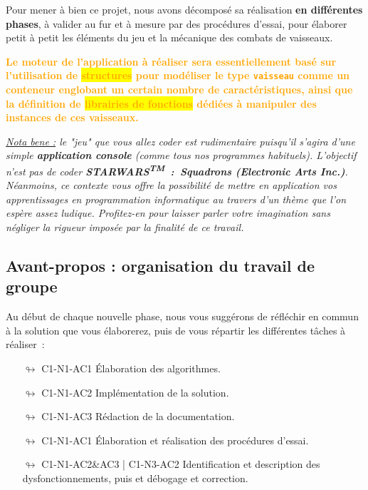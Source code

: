 \documentclass[10pt, fleqn, a4paper]{article}
\newcommand{\bfcolor}[2]{\textcolor{#1}{\textbf{#2}}}
\newcommand{\itcolor}[2]{\textcolor{#1}{\textit{#2}}}
\begin{document}
Pour mener à bien ce projet, nous avons décomposé sa réalisation \bfcolor{greenTP}{en différentes phases}, à valider au fur et à mesure par des procédures d'essai, pour élaborer petit à petit les éléments du jeu et la mécanique des combats de vaisseaux.

\bfcolor{orange}{Le moteur de l'application à réaliser sera essentiellement basé sur l'utilisation de \colorbox{yellow}{structures} pour \og{}modéliser\fg{} le type \texttt{vaisseau} comme un conteneur englobant un certain nombre de caractéristiques, ainsi que la définition de \colorbox{yellow}{librairies de fonctions} dédiées à manipuler des instances de ces vaisseaux.}

\itcolor{greenTP}{\underline{Nota bene :} le "jeu" que vous allez coder est rudimentaire puisqu'il s'agira d'une simple \textbf{application console} (comme tous nos programmes habituels). L'objectif n'est pas de coder \bfcolor{greenTP}{STARWARS\textsuperscript{TM}~:~Squadrons (Electronic Arts Inc.)}. Néanmoins, ce contexte vous offre la possibilité de mettre en application vos apprentissages en programmation informatique au travers d'un thème que l'on espère assez ludique. Profitez-en pour laisser parler votre imagination sans négliger la rigueur imposée par la finalité de ce travail.}

\subsection*{Avant-propos : organisation du travail de groupe}

Au début de chaque nouvelle phase, nous vous suggérons de réfléchir en commun à la solution que vous élaborerez, puis de vous répartir les différentes tâches à réaliser~:
\begin{itemize}
\item[$\looparrowright$] \colorbox{redC1}{C1-N1-AC1} Élaboration des algorithmes.
\item[$\looparrowright$] \colorbox{redC1}{C1-N1-AC2} Implémentation de la solution.
\item[$\looparrowright$] \colorbox{redC1}{C1-N1-AC3} Rédaction de la documentation.
\item[$\looparrowright$] \colorbox{greenC2}{C1-N1-AC1} Élaboration et réalisation des procédures d'essai.
\item[$\looparrowright$] \colorbox{greenC2}{C1-N1-AC2\&AC3 | C1-N3-AC2} Identification et description des dysfonctionnements, puis et débogage et correction.
\end{itemize}
\end{document}
